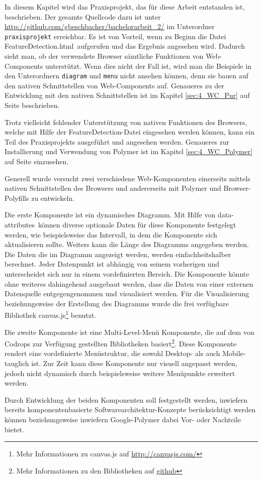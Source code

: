 In diesem Kapitel wird das Praxisprojekt, das für diese Arbeit entstanden ist, beschrieben. Der gesamte Quellcode dazu ist unter \url{http://github.com/gbeschbacher/bachelorarbeit_2/} im Unterordner \lstinline|praxisprojekt| erreichbar. Es ist von Vorteil, wenn zu Beginn die Datei \glqq FeatureDetection.html\grqq\ aufgerufen und das Ergebnis angesehen wird. Dadurch sieht man, ob der verwendete Browser sämtliche Funktionen von Web-Components unterstützt. Wenn dies nicht der Fall ist, wird man die Beispiele in den Unterordnern \lstinline|diagram| und \lstinline|menu| nicht ansehen können, denn sie bauen auf den nativen Schnittstellen von Web-Components auf. Genaueres zu der Entwicklung mit den nativen Schnittstellen ist im Kapitel \ref{sec:4_WC_Pur} auf Seite \pageref{sec:4_WC_Pur} beschrieben.

Trotz vielleicht fehlender Unterstützung von nativen Funktionen des Browsers, welche mit Hilfe der FeatureDetection-Datei eingesehen werden können, kann ein Teil des Praxisprojekts ausgeführt und angesehen werden. Genaueres zur Installierung und Verwendung von Polymer ist im Kapitel \ref{sec:4_WC_Polymer} auf Seite \pageref{sec:4_WC_Polymer} einzusehen.

Generell wurde versucht zwei verschiedene Web-Komponenten einerseits mittels nativen Schnittstellen des Browsers und andererseits mit Polymer und Browser-Polyfills zu entwickeln.

Die erste Komponente ist ein dynamisches Diagramm. Mit Hilfe von \glqq data-attributes\grqq\ können diverse optionale Daten für diese Komponente festgelegt werden, wie beispielsweise das Intervall, in dem die Komponente sich aktualisieren sollte. Weiters kann die Länge des Diagramms angegeben werden. Die Daten die im Diagramm angezeigt werden, werden einfachheitshalber berechnet. Jeder Datenpunkt ist abhängig von seinem vorherigen und unterscheidet sich nur in einem vordefinierten Bereich. Die Komponente könnte ohne weiteres dahingehend ausgebaut werden, dass die Daten von einer externen Datenquelle entgegengenommen und visualisiert werden. Für die Visualisierung beziehungsweise der Erstellung des Diagramms wurde die frei verfügbare Bibliothek canvas.js\footnote{Mehr Informationen zu canvas.js auf \href{http://canvasjs.com/}{http://canvasjs.com/}} benutzt.

Die zweite Komponente ist eine \glqq Multi-Level\grqq -Menü Komponente, die auf dem von Codrops zur Verfügung gestellten Bibliotheken basiert\footnote{Mehr Informationen zu den Bibliotheken auf \href{https://github.com/codrops/MultiLevelPushMenu}{github}}. Diese Komponente rendert eine vordefinierte Menüstruktur, die sowohl Desktop- als auch Mobile-tauglich ist. Zur Zeit kann diese Komponente nur visuell angepasst werden, jedoch nicht dynamisch durch beispielsweise weitere Menüpunkte erweitert werden.

Durch Entwicklung der beiden Komponenten soll festgestellt werden, inwiefern bereits komponentenbasierte Softwarearchitektur-Konzepte berücksichtigt werden können beziehungsweise inwiefern Google-Polymer dabei Vor- oder Nachteile bietet.